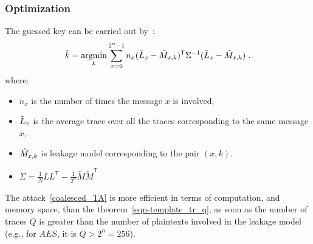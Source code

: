 \documentclass{beamer}
\DeclareMathOperator*\argmin{argmin}
\begin{document}
\begin{frame}

\frametitle{Optimization}
The guessed key can be carried out by~\cite{OULADJ2019, ouladj2021side}: %
%
\begin{equation}
\Hat{k} = \argmin_k \sum_{x=0}^{2^n-1} n_x(\Tilde{L}_x - \Tilde{M}_{x, k})^\mathsf{T} \Sigma^{-1} ( \Tilde{L}_x  -  \Tilde{M}_{x, k}) \ .
\label{coalesced_TA}
\end{equation}
\vspace{-2mm}
where:
\begin{itemize}
\item $n_x$ is the number of times the message $x$ is involved,
\item $\Tilde{L}_x$ is the average trace over all the traces corresponding to the same message $x$,
\item $\Tilde{M}_{x,k}$ is leakage model corresponding to the pair $(x,k)$. 
\item $\Sigma = \frac1N L L^\mathsf{T} - \frac1{2^n} \tilde{M} \tilde{M}^\mathsf{T}$ %
\end{itemize}
\pause

The attack~\eqref{coalesced_TA} is more efficient in terms of computation, and memory space, than the theorem~\ref{eqn-template_tr_q}, as soon as the number of traces $Q$ is greater than the number of plaintexts involved in the leakage model (e.g., for $AES$, it is $Q > 2^n = 256$). 






\end{frame}
\end{document}
